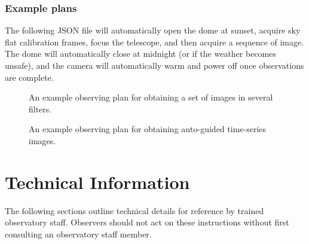 \documentclass[12pt,a4paper]{article}
\begin{document}
\subsubsection{Example plans}\label{app:JSON}
The following JSON file will automatically open the dome at sunset, acquire sky flat calibration frames, focus the telescope, and then acquire a sequence of image. The dome will automatically close at midnight (or if the weather becomes unsafe), and the camera will automatically warm and power off once observations are complete.

\begin{figure}
    \centering
    
    \caption{An example observing plan for obtaining a set of images in several filters.}
    \label{fig:exampleplan1}
\end{figure}

\begin{figure}
    \centering
    
    \caption{An example observing plan for obtaining auto-guided time-series images.}
    \label{fig:exampleplan2}
\end{figure}

\clearpage
\section{Technical Information}\label{app:technical}
The following sections outline technical details for reference by trained observatory staff. Observers should not act on these instructions without first consulting an observatory staff member.
\end{document}
